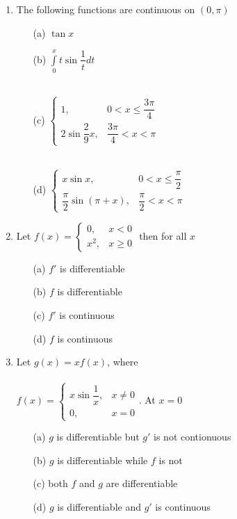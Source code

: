 \begin{enumerate}[label=\arabic*.,ref=\thesubsection.\theenumi]
\item The following functions are continuous on $(0,\pi)$
\begin{itemize}
\item[(a)] $\tan x$ \\
\item[(b)] $\int\limits_0^xt\sin\dfrac{1}{t}dt$\\ \\
\item[(c)] $\begin{cases}
1, & \text{$0<x\leq\dfrac{3\pi}{4}$} \\
2\sin\dfrac{2}{9}x, & \text{$\dfrac{3\pi}{4}<x<\pi$}
\end{cases}$ \\ \\
\item[(d)] $\begin{cases}
x\sin x, & \text{$0<x\leq\dfrac{\pi}{2}$} \\
\dfrac{\pi}{2}\sin (\pi+x), & \text{$\dfrac{\pi}{2}<x<\pi$}
\end{cases}$
\end{itemize}

\item Let $f(x)=\begin{cases}
0, & \text{$x<0$}\\
x^2, & \text{$x\geq 0$}
\end{cases}$ then for all $x$
\begin{itemize}
\item[(a)] $f'$ is differentiable \item[(b)] $f$ is differentiable \item[(c)] $f'$ is continuous \item[(d)] $f$ is continuous
\end{itemize}

\item Let $g(x)=xf(x)$, where \\
\\$f(x)=\begin{cases}
x\sin\dfrac{1}{x}, & \text{$x\ne 0$}\\
0, & \text{$x=0$}
\end{cases}$. At $x=0$ \\
\begin{itemize}
\item[(a)] $g$ is differentiable but $g'$ is not contionuous
\item[(b)] $g$ is differentiable while $f$ is not
\item[(c)] both $f$ and $g$ are differentiable
\item[(d)] $g$ is differentiable and $g'$ is continuous \\
\end{itemize}


\end{enumerate}
